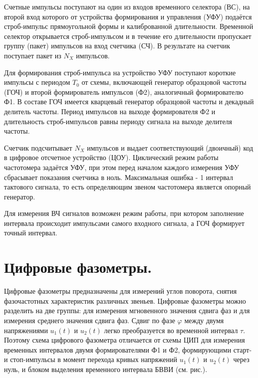 \documentclass[unicode, 12pt, a4paper, oneside]{article}
\begin{document}
Счетные импульсы поступают на один из входов временного селектора (ВС), на второй вход которого от устройства формирования и управления (УФУ) подаётся строб-импульс прямоугольной формы и калиброванной длительности. Временной селектор открывается строб-импульсом  и в течение его длительности пропускает группу (пакет) импульсов на вход счетчика (СЧ). В результате на счетчик поступает пакет из $N_X$ импульсов.

Для формирования строб-импульса на устройство УФУ поступают короткие импульсы с периодом $T_0$ от схемы, включающей генератор образцовой частоты (ГОЧ) и второй формирователь импульсов (Ф2), аналогичный формирователю Ф1. В составе ГОЧ имеется кварцевый генератор образцовой частоты и декадный делитель частоты. Период импульсов на выходе формирователя Ф2 и длительность строб-импульсов равны периоду сигнала на выходе делителя частоты.

Счетчик подсчитывает $N_X$ импульсов и выдает соответствующий (двоичный) код в цифровое отсчетное устройство (ЦОУ). Циклический режим работы частотомера задаётся УФУ, при этом перед началом каждого измерения УФУ сбрасывает показания счетчика в ноль. Максимальная ошибка - 1 интервал тактового сигнала, то есть определяющим звеном частотомера является опорный генератор.

Для измерения ВЧ сигналов возможен режим работы, при котором заполнение интервала происходит импульсами самого входного сигнала, а ГОЧ формирует точный интервал.

\section{Цифровые фазометры.}

Цифровые фазометры предназначены для измерений углов поворота, снятия фазочастотных характеристик различных звеньев. Цифровые фазометры можно разделить на две группы: для измерения мгновенного значения сдвига фаз и для измерения среднего значения сдвига фаз. Сдвиг по фазе $\varphi$ между двумя напряжениями $u_1 (t)$ и $u_2 (t)$ легко преобразуется во временной интервал $\tau$.
Поэтому схема цифрового фазометра отличается от схемы ЦИП для измерения временных интервалов двумя формирователями Ф1 и Ф2, формирующими старт- и стоп-импульсы в момент перехода кривых напряжений $u_1 (t)$ и $u_2 (t)$ через нуль, и блоком выделения временного интервала БВВИ (см. рис.).
\end{document}

